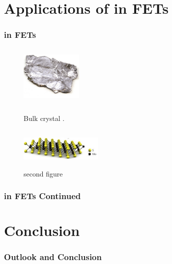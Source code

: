 \documentclass{beamer}
\begin{document}
\section{Applications of  in FETs}
\begin{frame}
\frametitle{ in FETs}
\begin{figure}
	\centering
	\begin{minipage}{0.45\textwidth}
		\centering
		\includegraphics[height=3cm,width=3cm]{../present_figs/bulkMoS2crystal}
		\caption{Bulk  crystal \cite{Wang2012}.}
	\end{minipage}\hfill
	\begin{minipage}{0.45\textwidth}
		\centering
		\includegraphics[height=2cm,width=4cm]{../present_figs/mos2monolayer}
		\caption{second figure}
	\end{minipage}
\end{figure}
\end{frame}

\begin{frame}
\frametitle{ in FETs Continued}
\end{frame}
\section{Conclusion}
\begin{frame}
\frametitle{Outlook and Conclusion}
\end{frame}
\end{document}
